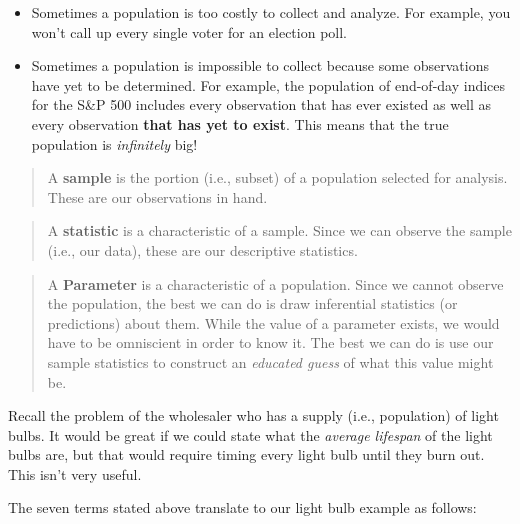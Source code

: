 \documentclass[
]{book}
\begin{document}
\begin{itemize}
\item
  Sometimes a population is too costly to collect and analyze. For example, you won't call up every single voter for an election poll.
\item
  Sometimes a population is impossible to collect because some observations have yet to be determined. For example, the population of end-of-day indices for the S\&P 500 includes every observation that has ever existed as well as every observation \textbf{that has yet to exist}. This means that the true population is \emph{infinitely} big!
\end{itemize}

\begin{quote}
A \textbf{sample} is the portion (i.e., subset) of a population selected for analysis. These are our observations in hand.
\end{quote}

\begin{quote}
A \textbf{statistic} is a characteristic of a sample. Since we can observe the sample (i.e., our data), these are our descriptive statistics.
\end{quote}

\begin{quote}
A \textbf{Parameter} is a characteristic of a population. Since we cannot observe the population, the best we can do is draw inferential statistics (or predictions) about them. While the value of a parameter exists, we would have to be omniscient in order to know it. The best we can do is use our sample statistics to construct an \emph{educated guess} of what this value might be.
\end{quote}

Recall the problem of the wholesaler who has a supply (i.e., population) of light bulbs. It would be great if we could state what the \emph{average lifespan} of the light bulbs are, but that would require timing every light bulb until they burn out. This isn't very useful.

The seven terms stated above translate to our light bulb example as follows:
\end{document}
